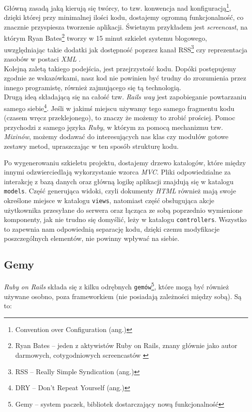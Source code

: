 \documentclass[12pt,twoside]{report}
\begin{document}
Główną zasadą jaką kierują się twórcy, to tzw. konwencja nad
konfiguracją\footnote{Convention over Configuration (ang.)}, dzięki której przy minimalnej
ilości kodu, dostajemy ogromną funkcjonalność, co znacznie przyspiesza tworzenie
aplikacji. Świetnym przykładem jest \emph{screencast}, na którym Ryan
Bates\footnote{Ryan Bates -- jeden z aktywistów Ruby on Rails, znany głównie jako autor
darmowych, cotygodniowych screencastów \cite{ryan-bates}} tworzy w 15 minut szkielet
systemu blogowego, uwzględniając takie dodatki jak dostępność poprzez kanał
RSS\footnote{RSS -- Really Simple Syndication (ang.)} czy reprezentacja zasobów w postaci
\emph{XML} \cite{blog-in-15-min}.\\
Kolejną zaletą takiego podejścia, jest przejrzystość kodu. Dopóki postępujemy zgodnie ze
wskazówkami, nasz kod nie powinien być trudny do zrozumienia przez innego programistę,
również zajmującego się tą technologią.\\
Drugą ideą składającą się na całość tzw. \emph{Rails way} jest zapobieganie powtarzaniu
samego siebie\footnote{DRY -- Don't Repeat Yourself (ang.)}. Jeśli w jakimś miejscu używamy
tego samego fragmentu kodu (czasem wręcz przeklejonego), to znaczy że możemy to zrobić
prościej. Pomoc przychodzi z samego języka \emph{Ruby}, w którym za pomocą mechanizmu
tzw. \emph{Mixinów}, możemy dodawać do interesujących nas klas czy modułów gotowe zestawy
metod, upraszczając w ten sposób strukturę kodu.


Po wygenerowaniu szkieletu projektu, dostajemy drzewo katalogów, które między innymi
odzwierciedlają wykorzystanie wzorca \emph{MVC}. Pliki odpowiedzialne za interakcję z
bazą danych oraz główną logikę aplikacji znajdują się w katalogu \texttt{models}. Część
generująca widoki, czyli dokumenty \emph{HTML} również mają swoje określone miejsce w
katalogu \texttt{views}, natomiast część obsługująca akcje użytkownika przesyłane do serwera
oraz łącząca ze sobą poprzednio wymienione komponenty, jak nie trudno się domyślić, leży w
katalogu \texttt{controllers}. Wszystko to zapewnia nam odpowiednią separację kodu, dzięki
czemu modyfikacje poszczególnych elementów, nie powinny wpływać na siebie.


\subsection{Gemy}
\emph{Ruby on Rails} składa się z kilku odrębnych \texttt{gemów}\footnote{Gemy -- system
paczek, bibliotek dostarczający nową funkcjonalność}, które mogą być również używane
osobno, poza frameworkiem (nie posiadają zależności między sobą). Są to:
\end{document}
